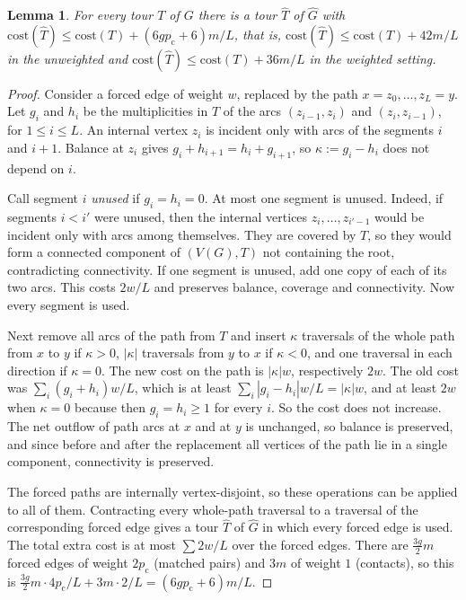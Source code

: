 \documentclass[11pt]{amsart}
\newtheorem{lemma}[theorem]{Lemma}
\theoremstyle{definition}
\theoremstyle{remark}
\numberwithin{equation}{section}
\newcommand{\cost}{\mathrm{cost}}
\newcommand{\pc}{p_{\mathrm{c}}}
\newcommand{\Gh}{\widehat{G}}
\newcommand{\Th}{\widehat{T}}
\begin{document}
\begin{lemma}\label{lem:normalize}
For every tour $T$ of $G$ there is a tour $\Th$ of $\Gh$ with $\cost(\Th)\le\cost(T)+(6g\pc+6)m/L$, that is, $\cost(\Th)\le\cost(T)+42m/L$ in the unweighted and $\cost(\Th)\le\cost(T)+36m/L$ in the weighted setting.
\end{lemma}

\begin{proof}
Consider a forced edge of weight $w$, replaced by the path $x=z_0,\dots,z_L=y$. Let $g_i$ and $h_i$ be the multiplicities in $T$ of the arcs $(z_{i-1},z_i)$ and $(z_i,z_{i-1})$, for $1\le i\le L$. An internal vertex $z_i$ is incident only with arcs of the segments $i$ and $i+1$. Balance at $z_i$ gives $g_i+h_{i+1}=h_i+g_{i+1}$, so $\kappa:=g_i-h_i$ does not depend on $i$.

Call segment $i$ \emph{unused} if $g_i=h_i=0$. At most one segment is unused. Indeed, if segments $i<i'$ were unused, then the internal vertices $z_i,\dots,z_{i'-1}$ would be incident only with arcs among themselves. They are covered by $T$, so they would form a connected component of $(V(G),T)$ not containing the root, contradicting connectivity. If one segment is unused, add one copy of each of its two arcs. This costs $2w/L$ and preserves balance, coverage and connectivity. Now every segment is used.

Next remove all arcs of the path from $T$ and insert $\kappa$ traversals of the whole path from $x$ to $y$ if $\kappa>0$, $|\kappa|$ traversals from $y$ to $x$ if $\kappa<0$, and one traversal in each direction if $\kappa=0$. The new cost on the path is $|\kappa|w$, respectively $2w$. The old cost was $\sum_i(g_i+h_i)w/L$, which is at least $\sum_i|g_i-h_i|w/L=|\kappa|w$, and at least $2w$ when $\kappa=0$ because then $g_i=h_i\ge1$ for every $i$. So the cost does not increase. The net outflow of path arcs at $x$ and at $y$ is unchanged, so balance is preserved, and since before and after the replacement all vertices of the path lie in a single component, connectivity is preserved.

The forced paths are internally vertex-disjoint, so these operations can be applied to all of them. Contracting every whole-path traversal to a traversal of the corresponding forced edge gives a tour $\Th$ of $\Gh$ in which every forced edge is used. The total extra cost is at most $\sum 2w/L$ over the forced edges. There are $\frac{3g}{2}m$ forced edges of weight $2\pc$ (matched pairs) and $3m$ of weight $1$ (contacts), so this is $\frac{3g}{2}m\cdot4\pc/L+3m\cdot2/L=(6g\pc+6)m/L$.
\end{proof}
\end{document}
